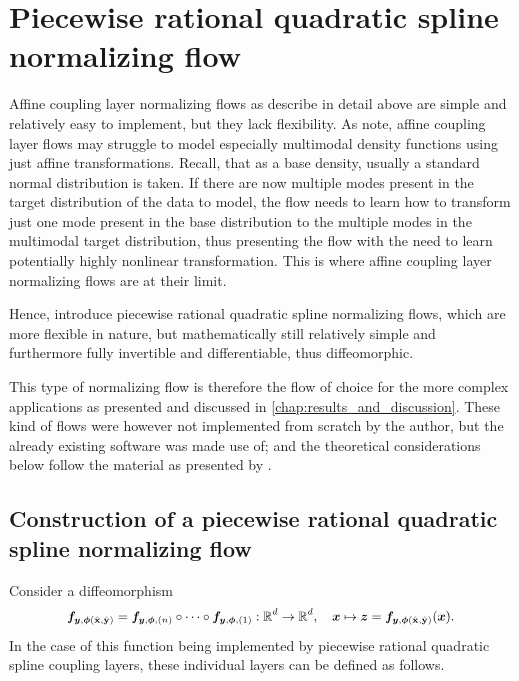 \documentclass[a4paper,12pt]{report}
\begin{document}
\section{Piecewise rational quadratic spline normalizing flow}\label{subsec:normflowspiecewiserational}
Affine coupling layer normalizing flows as describe in detail above are simple and relatively easy to implement, but they lack flexibility. As \cite[p.3]{Durkan.10.06.2019} note, affine coupling layer flows may struggle to model especially multimodal density functions using just affine transformations. Recall, that as a base density, usually a standard normal distribution is taken. If there are now multiple modes present in the target distribution of the data to model, the flow needs to learn how to transform just one mode present in the base distribution to the multiple modes in the multimodal target distribution, thus presenting the flow with the need to learn potentially highly nonlinear transformation. This is where affine coupling layer normalizing flows are at their limit.

Hence, \cite[p.4]{Durkan.10.06.2019} introduce piecewise rational quadratic spline normalizing flows, which are more flexible in nature, but mathematically still relatively simple and furthermore fully invertible and differentiable, thus diffeomorphic.

This type of normalizing flow is therefore the flow of choice for the more complex applications as presented and discussed in \cref{chap:results_and_discussion}. These kind of flows were however not implemented from scratch by the author, but the already existing software \cite{nflows} was made use of; and the theoretical considerations below follow the material as presented by \cite{Durkan.10.06.2019}.

\subsection{Construction of a piecewise rational quadratic spline normalizing flow}\label{sec:piecewisequadraticspline}
Consider a diffeomorphism \begin{align}\small\begin{aligned}
\bm{f}_{\bm{y},\bm{\phi}(\hat{\boldsymbol{\mathbf{x}}},\hat{\boldsymbol{\mathbf{y}}})} = \bm{f}_{\bm{y},\bm{\phi},(n)}\circ \dots \circ \bm{f}_{\bm{y},\bm{\phi},(1)}: \mathbb{R}^d \rightarrow \mathbb{R}^d, \quad \bm{x} \mapsto \bm{z} = \bm{f}_{\bm{y},\bm{\phi}(\hat{\boldsymbol{\mathbf{x}}},\hat{\boldsymbol{\mathbf{y}}})}(\bm{x}).
\end{aligned}\end{align} In the case of this function being implemented by piecewise rational quadratic spline coupling layers, these individual layers can be defined as follows.
\end{document}
